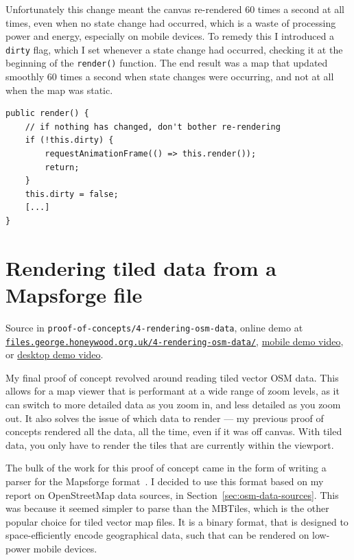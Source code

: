 \documentclass{final_report}
\begin{document}
Unfortunately this change meant the canvas re-rendered 60 times a second at all times, even when no state change had occurred, which is a waste of processing power and energy, especially on mobile devices. To remedy this I introduced a \texttt{dirty} flag, which I set whenever a state change had occurred, checking it at the beginning of the \texttt{render()} function. The end result was a map that updated smoothly 60 times a second when state changes were occurring, and not at all when the map was static.

\begin{lstlisting}[caption=Only rendering when the map state is \texttt{dirty}]
public render() {
    // if nothing has changed, don't bother re-rendering
    if (!this.dirty) {
        requestAnimationFrame(() => this.render());
        return;
    }
    this.dirty = false;
    [...]
}
\end{lstlisting}

\section{Rendering tiled data from a Mapsforge file}

{ \footnotesize Source in \texttt{proof-of-concepts/4-rendering-osm-data}, online demo at \href{https://files.george.honeywood.org.uk/4-rendering-osm-data/#15/50.7895/-1.8938}{\nolinkurl{files.george.honeywood.org.uk/4-rendering-osm-data/}}, \href{https://youtu.be/2cvZ-veBUto}{mobile demo video}, or \href{https://youtu.be/0evN3RT42QQ}{desktop demo video}.}

My final proof of concept revolved around reading tiled vector OSM data. This allows for a map viewer that is performant at a wide range of zoom levels, as it can switch to more detailed data as you zoom in, and less detailed as you zoom out. It also solves the issue of which data to render --- my previous proof of concepts rendered all the data, all the time, even if it was off canvas. With tiled data, you only have to render the tiles that are currently within the viewport.

The bulk of the work for this proof of concept came in the form of writing a parser for the Mapsforge format~\cite{mapsforge-format}. I decided to use this format based on my report on OpenStreetMap data sources, in Section~\ref{sec:osm-data-sources}. This was because it seemed simpler to parse than the MBTiles, which is the other popular choice for tiled vector map files. It is a binary format, that is designed to space-efficiently encode geographical data, such that can be rendered on low-power mobile devices.
\end{document}
